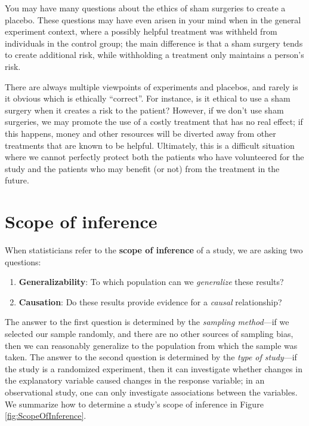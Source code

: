 \documentclass[
  10pt,
  openany]{book}
\providecommand{\tightlist}{%
  \setlength{\itemsep}{0pt}\setlength{\parskip}{0pt}}
\theoremstyle{definition}
\theoremstyle{definition}
\theoremstyle{definition}
\theoremstyle{definition}
\theoremstyle{remark}
\begin{document}
You may have many questions about the ethics of sham surgeries to create a placebo.
These questions may have even arisen in your mind when in the general experiment context, where a possibly helpful treatment was withheld from individuals in the control group; the main difference is that a sham surgery tends to create additional risk, while withholding a treatment only maintains a person's risk.

There are always multiple viewpoints of experiments and placebos, and rarely is it obvious which is ethically ``correct''.
For instance, is it ethical to use a sham surgery when it creates a risk to the patient?
However, if we don't use sham surgeries, we may promote the use of a costly treatment that has no real effect; if this happens, money and other resources will be diverted away from other treatments that are known to be helpful.
Ultimately, this is a difficult situation where we cannot perfectly protect both the patients who have volunteered for the study and the patients who may benefit (or not) from the treatment in the future.

\section{Scope of inference}\label{scope-of-inference}

When statisticians refer to the \textbf{scope of inference} of a study,
we are asking two questions:

\begin{enumerate}
\def\labelenumi{\arabic{enumi}.}
\tightlist
\item
  \textbf{Generalizability}: To which population can we \emph{generalize} these results?
\item
  \textbf{Causation}: Do these results provide evidence for a \emph{causal} relationship?
\end{enumerate}

The answer to the first question is determined by the \emph{sampling method}---if we selected our sample randomly, and there are no other sources of sampling bias, then we can reasonably generalize to the population from which the sample was taken. The answer to the second question is determined by the \emph{type of study}---if the study is a randomized experiment, then it can investigate whether changes in the explanatory variable caused changes in the response variable; in an observational study, one can only investigate associations between the variables. We summarize how to determine a study's scope of inference in Figure \ref{fig:ScopeOfInference}.
\end{document}
